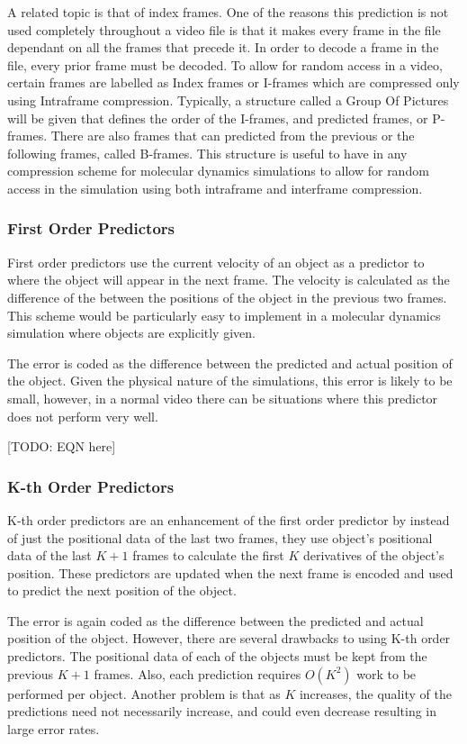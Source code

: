 \documentclass[a4paper,11pt]{report}
\begin{document}
A related topic is that of index frames. One of the reasons this prediction is not used completely throughout a video file is that it makes every frame in the file dependant on all the frames that precede it. In order to decode a frame in the file, every prior frame must be decoded. To allow for random access in a video, certain frames are labelled as Index frames or I-frames which are compressed only using Intraframe compression. Typically, a structure called a Group Of Pictures will be given that defines the order of the I-frames, and predicted frames, or P-frames\cite{vandalore2001sal}. There are also frames that can predicted from the previous or the following frames, called B-frames. This structure is useful to have in any compression scheme for molecular dynamics simulations to allow for random access in the simulation using both intraframe and interframe compression.

\subsubsection*{First Order Predictors}

First order predictors use the current velocity of an object as a predictor to where the object will appear in the next frame. The velocity is calculated as the difference of the between the positions of the object in the previous two frames. This scheme would be particularly easy to implement in a molecular dynamics simulation where objects are explicitly given.

The error is coded as the difference between the predicted and actual position of the object. Given the physical nature of the simulations, this error is likely to be small, however, in a normal video there can be situations where this predictor does not perform very well.

[TODO: EQN here]
\subsubsection*{K-th Order Predictors}

K-th order predictors are an enhancement of the first order predictor by instead of just the positional data of the last two frames, they use object's positional data of the last $K+1$ frames to calculate the first $K$ derivatives of the object's position. These predictors are updated when the next frame is encoded and used to predict the next position of the object.

The error is again coded as the difference between the predicted and actual position of the object. However, there are several drawbacks to using K-th order predictors. The positional data of each of the objects must be kept from the previous $K+1$ frames. Also, each prediction requires $O(K^2)$ work to be performed per object. Another problem is that as $K$ increases, the quality of the predictions need not necessarily increase, and could even decrease resulting in large error rates.
\end{document}
